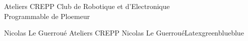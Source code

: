 \usepackage[Glenn]{fncychap}   %
\geometry{hmargin=2cm,vmargin=2.5cm}
\addPresentation
{Ateliers CREPP} {} {\currentChapter}
{Club de Robotique et d'Electronique\\Programmable de Ploemeur} {} {\currentPage}

\setcounter{tocdepth}{2} %
\setcounter{secnumdepth}{2}

\renewcommand{\nomname}{Conventions}
\begin{comment}
@input Titre du PDF
@input Auteur(s)
@input Sujet du fichier PDF (courte phrase)
@input Créateur du fichier PDF
@input Producteur du fichier PDF
@input Mots-clés (liste)
@input Couleurs des liens
@input Couleurs des citations dans la bibliographie
@input Couleurs des liens de fichier
\end{comment}
 {Nicolas Le Guerroué} {Ateliers CREPP} {Nicolas Le Guerroué}{Latex}{green}{blue}{blue}
  


  \makeatletter
  \def\@makechapterhead#1{%
    \vspace*{-20pt}%
    {\parindent \z@ \raggedright \normalfont
      \ifnum \c@secnumdepth >\m@ne
        \if@mainmatter%
          \DOCH
        \fi
      \fi
      \interlinepenalty\@M
      \if@mainmatter%
        \DOTI{#1}%
      \else%
        \DOTIS{#1}%
      \fi
    }}
  \makeatother